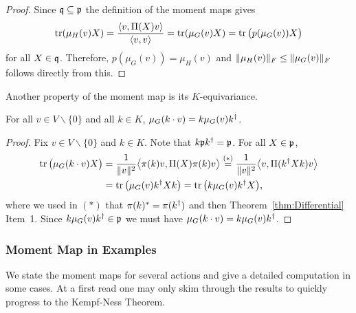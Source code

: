 \begin{proof}
	Since $\mathfrak{q} \subseteq \mathfrak{p}$ the definition of the moment maps gives
		\[ \operatorname{tr}(\mu_{H}(v) X) = \frac{\langle v, \Pi(X)v \rangle}{\langle v,v \rangle} = \operatorname{tr}(\mu_{G}(v) X) = \operatorname{tr} \big( p(\mu_G(v)) X \big) \]
	for all $X \in \mathfrak{q}$. Therefore, $p(\mu_G(v)) = \mu_{H}(v)$ and $\lVert\mu_{H}(v)\rVert_F \leq \lVert\mu_{G}(v)\rVert_F$ follows directly from this.
\end{proof}

Another property of the moment map is its $K$-equivariance.

\begin{prop}\label{prop:UnitaryEquivarianceMomentMap}
	For all $v \in V \backslash \{0\}$ and all $k \in K$, $\mu_G(k\cdot v) = k \mu_G(v) k^{\dagger}$.
\end{prop}

\begin{proof}
	Fix $v \in V \backslash \{0\}$ and $k \in K$. Note that $k \mathfrak{p} k^{\dagger} = \mathfrak{p}$.
	For all $X \in \mathfrak{p}$,
		\begin{align*}
			\operatorname{tr} \big( \mu_G(k \cdot v) X \big) &= \frac{1}{\| v \|^2} \big\langle \pi(k) v, \Pi(X) \pi(k) v \big\rangle
			\overset{(*)}{=} \frac{1}{\| v \|^2} \big\langle v, \Pi(k^{\dagger} X k ) v \big\rangle \\
			&= \operatorname{tr} \big( \mu_G(v) k^{\dagger} X k \big) = \operatorname{tr} \big( k \mu_G(v) k^{\dagger} X \big) ,
		\end{align*}
	where we used in $(*)$ that $\pi(k)^{\ast} = \pi(k^{\dagger})$ and then Theorem~\ref{thm:Differential} Item~1. Since $k \mu_G(v) k^{\dagger} \in \mathfrak{p}$ we must have $\mu_G(k \cdot v) = k \mu_G(v) k^{\dagger}$.
\end{proof}





\subsubsection{Moment Map in Examples}

We state the moment maps for several actions and give a detailed computation in some cases. At a first read one may only skim through the results to quickly progress to the Kempf-Ness Theorem.

